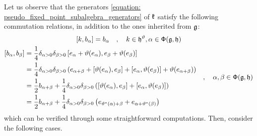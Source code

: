         Let us observe that the generators \eqref{equation: pseudo_fixed_point_subalgebra_generators} of $\mathfrak{k}$ satisfy the following commutation relations, in addition to the ones inherited from $\mathfrak{g}$:
            \begin{equation} \label{equation: pseudo_fixed_point_subalgebra_relations}
                \begin{gathered}
                    [k, b_{\alpha}] = b_{\alpha} \quad, \quad k \in \h^{\vartheta}, \alpha \in \rootsystem(\g, \h)
                    \\
                    \begin{aligned}
                        [b_{\alpha}, b_{\beta}] & = \frac14 \delta_{\alpha > 0} \delta_{\beta > 0} \left[ e_{\alpha} + \vartheta(e_{\alpha}), e_{\beta} + \vartheta(e_{\beta}) \right]
                        \\
                        & = \frac14 \delta_{\alpha > 0} \delta_{\beta > 0} \left( e_{\alpha + \beta} + [ \vartheta(e_{\alpha}), e_{\beta} ] + [ e_{\alpha}, \vartheta(e_{\beta}) ] + \vartheta(e_{\alpha + \beta}) \right)
                        \\
                        & = \frac12 b_{\alpha + \beta} + \frac14 \delta_{\alpha > 0} \delta_{\beta > 0} \left( [ \vartheta(e_{\alpha}), e_{\beta} ] + [ e_{\alpha}, \vartheta(e_{\beta}) ] \right)
                        \\
                        & = \frac12 b_{\alpha + \beta} + \frac14 \delta_{\alpha > 0} \delta_{\beta > 0} \left( e_{\vartheta^*(\alpha) + \beta} + e_{\alpha + \vartheta^*(\beta)} \right)
                    \end{aligned}
                    \quad, \quad \alpha, \beta \in \rootsystem(\g, \h)
                \end{gathered}
            \end{equation}
        which can be verified through some straightforward computations. Then, consider the following cases.
